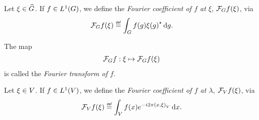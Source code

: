 \begin{definition}
\label{definition:Fourier_coefficient}
    Let $\xi \in \dualGroup\Group$.
    If $f \in \Lebesgue{1}{\Group}$,
    we define the \emph{Fourier coefficient of $f$ at $\xi$}, $\Fourier f(\xi)$, via
    \begin{align}
        \Fourier f(\xi) \defeq \int_\Group f(g) \adj{\xi(g)} \dd g.
        \label{eq:definition_of_Fourier_coefficient}
    \end{align}

    The map
    \begin{align*}
        \Fourier f : \xi \mapsto \Fourier f(\xi)
    \end{align*}
    is called the \emph{Fourier transform of $f$}.
\end{definition}

\begin{definition}
    Let $\xi \in \VectorSpace$.
    If $f \in \Lebesgue{1}\VectorSpace$,
    we define the \emph{Fourier coefficient of $f$ at $\lambda$}, $\Fourier[\VectorSpace] f(\xi)$, via
    \begin{align*}
        \Fourier[\VectorSpace] f(\xi) \defeq \int_\VectorSpace f(x) \e^{-\i \turn \ip{x}\xi} \dd x.
    \end{align*}
\end{definition}

